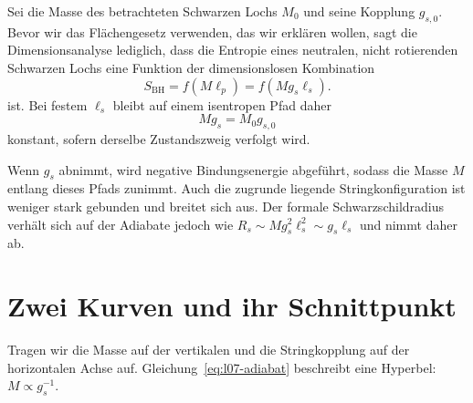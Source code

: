 Sei die Masse des betrachteten Schwarzen Lochs \(M_0\) und seine Kopplung \(g_{s,0}\). Bevor wir das Flächengesetz verwenden, das wir erklären wollen, sagt die Dimensionsanalyse lediglich, dass die Entropie eines neutralen, nicht rotierenden Schwarzen Lochs eine Funktion der dimensionslosen Kombination
\begin{equation}
S_{\mathrm{BH}}=f(M\ell_p)
=f(Mg_s\ell_s).
\label{eq:l07-entropy-function}
\end{equation}
ist.
Bei festem \(\ell_s\) bleibt auf einem isentropen Pfad daher
\begin{equation}
Mg_s=M_0g_{s,0}
\label{eq:l07-adiabat}
\end{equation}
konstant, sofern derselbe Zustandszweig verfolgt wird.

Wenn \(g_s\) abnimmt, wird negative Bindungsenergie abgeführt, sodass die Masse \(M\) entlang dieses Pfads zunimmt. Auch die zugrunde liegende Stringkonfiguration ist weniger stark gebunden und breitet sich aus. Der formale Schwarzschildradius verhält sich auf der Adiabate jedoch wie \(R_s\sim Mg_s^2\ell_s^2\sim g_s\ell_s\) und nimmt daher ab.

\begin{classroomqa}
\end{classroomqa}

\section{Zwei Kurven und ihr Schnittpunkt}

Tragen wir die Masse auf der vertikalen und die Stringkopplung auf der horizontalen Achse auf. Gleichung~\eqref{eq:l07-adiabat} beschreibt eine Hyperbel: \(M\propto g_s^{-1}\).

\begin{classroomqa}
\end{classroomqa}

